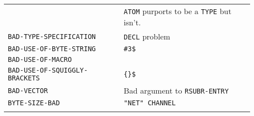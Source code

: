 \documentclass[a4paper]{scrbook}
\begin{document}
\begin{longtable}[]{@{}ll@{}}
\begin{minipage}[t]{0.58\columnwidth}
\end{minipage} & \begin{minipage}[t]{0.36\columnwidth}\raggedright\strut
\texttt{ATOM} purports to be a \texttt{TYPE} but isn't.\strut
\end{minipage}\tabularnewline
\begin{minipage}[t]{0.58\columnwidth}\raggedright\strut
\texttt{BAD-TYPE-SPECIFICATION}\strut
\end{minipage} & \begin{minipage}[t]{0.36\columnwidth}\raggedright\strut
\texttt{DECL} problem\strut
\end{minipage}\tabularnewline
\begin{minipage}[t]{0.58\columnwidth}\raggedright\strut
\texttt{BAD-USE-OF-BYTE-STRING}\strut
\end{minipage} & \begin{minipage}[t]{0.36\columnwidth}\raggedright\strut
\texttt{\#3\$}\strut
\end{minipage}\tabularnewline
\begin{minipage}[t]{0.58\columnwidth}\raggedright\strut
\texttt{BAD-USE-OF-MACRO}\strut
\end{minipage} & \begin{minipage}[t]{0.36\columnwidth}\raggedright\strut
\strut
\end{minipage}\tabularnewline
\begin{minipage}[t]{0.58\columnwidth}\raggedright\strut
\texttt{BAD-USE-OF-SQUIGGLY-BRACKETS}\strut
\end{minipage} & \begin{minipage}[t]{0.36\columnwidth}\raggedright\strut
\texttt{\{\}\$}\strut
\end{minipage}\tabularnewline
\begin{minipage}[t]{0.58\columnwidth}\raggedright\strut
\texttt{BAD-VECTOR}\strut
\end{minipage} & \begin{minipage}[t]{0.36\columnwidth}\raggedright\strut
Bad argument to \texttt{RSUBR-ENTRY}\strut
\end{minipage}\tabularnewline
\begin{minipage}[t]{0.58\columnwidth}\raggedright\strut
\texttt{BYTE-SIZE-BAD}\strut
\end{minipage} & \begin{minipage}[t]{0.36\columnwidth}\raggedright\strut
\texttt{"NET"\ CHANNEL}\strut
\end{minipage}\tabularnewline
\begin{minipage}[t]{0.58\columnwidth}\raggedright\strut

\end{minipage}
\end{longtable}
\end{document}
